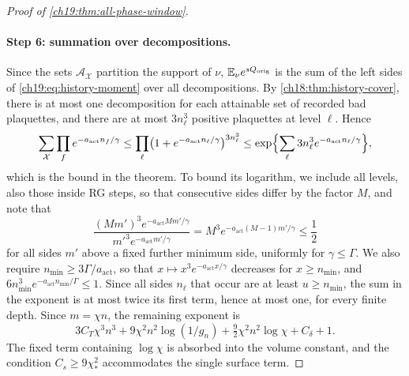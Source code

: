 \begin{proof}[Proof of \cref{ch19:thm:all-phase-window}]
\paragraph{Step 6: summation over decompositions.}
Since the sets $\mathcal A_{\mathcal X}$ partition the support of $\nu$, $\mathbb E_\nu e^{sQ_{\mathrm{orig}}}$ is the sum of the left sides of \eqref{ch19:eq:history-moment} over all decompositions. By \cref{ch18:thm:history-cover}, there is at most one decomposition for each attainable set of recorded bad plaquettes, and there are at most $3n_\ell^3$ positive plaquettes at level $\ell$. Hence
\[
 \sum_{\mathcal X}\prod_fe^{-a_{\mathrm{act}}n_f/\gamma}
 \le\prod_\ell\bigl(1+e^{-a_{\mathrm{act}}n_\ell/\gamma}\bigr)^{3n_\ell^3}
 \le\exp\Bigl\{\sum_\ell3n_\ell^3e^{-a_{\mathrm{act}}n_\ell/\gamma}\Bigr\},
\]
which is the bound in the theorem. To bound its logarithm, we include all levels, also those inside RG steps, so that consecutive sides differ by the factor $M$, and note that
\[
 \frac{(Mm')^3e^{-a_{\mathrm{act}}Mm'/\gamma}}{m'^3e^{-a_{\mathrm{act}}m'/\gamma}}=M^3e^{-a_{\mathrm{act}}(M-1)m'/\gamma}\le\frac12
\]
for all sides $m'$ above a fixed further minimum side, uniformly for $\gamma\le\Gamma$. We also require $n_{\min}\ge3\Gamma/a_{\mathrm{act}}$, so that $x\mapsto x^3e^{-a_{\mathrm{act}}x/\gamma}$ decreases for $x\ge n_{\min}$, and $6n_{\min}^3e^{-a_{\mathrm{act}}n_{\min}/\Gamma}\le1$. Since all sides $n_\ell$ that occur are at least $u\ge n_{\min}$, the sum in the exponent is at most twice its first term, hence at most one, for every finite depth. Since $m=\chi n$, the remaining exponent is
\[
 3C_T\chi^3n^3+9\chi^2n^2\log(1/g_n)+\tfrac92\chi^2n^2\log\chi+C_\delta+1.
\]
The fixed term containing $\log\chi$ is absorbed into the volume constant, and the condition $C_s\ge9\chi_*^2$ accommodates the single surface term.


\end{proof}
